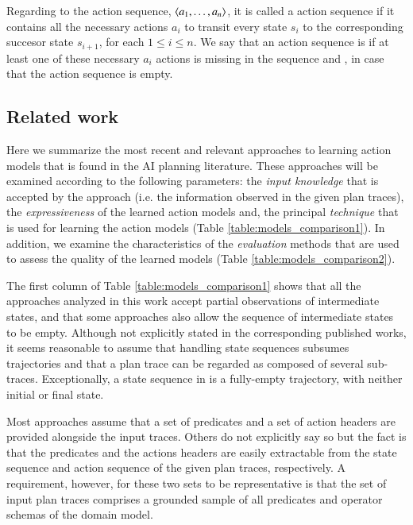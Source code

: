 Regarding to the action sequence, ${\langle a_1, \ldots, a_n \rangle}$, it is called a \FO action sequence if it contains all the necessary actions $a_i$ to transit every state $s_i$ to the corresponding succesor state $s_{i+1}$, for each {\small $1\leq i\leq n$}. We say that an action sequence is \PO if at least one of these necessary $a_i$ actions is missing in the sequence and \NO, in case that the action sequence is empty.


\subsection{Related work}
\label{related_work}

Here we summarize the most recent and relevant approaches to learning action models that is found in the AI planning literature. These approaches will be examined according to the following parameters: the {\em input knowledge} that is accepted by the approach (i.e. the information observed in the given plan traces), the {\em expressiveness} of the learned action models and, the principal {\em technique} that is used for learning the action models (Table \ref{table:models_comparison1}). In addition, we examine the characteristics of the {\em evaluation} methods that are used to assess the quality of the learned models (Table \ref{table:models_comparison2}).

The first column of Table \ref{table:models_comparison1} shows that all the approaches analyzed in this work accept partial observations of intermediate states, and that some approaches also allow the sequence of intermediate states to be empty. Although not explicitly stated in the corresponding published works, it seems reasonable to assume that handling \NO state sequences subsumes \POstar trajectories and that a \POstar plan trace can be regarded as composed of several \NO sub-traces. Exceptionally, a \NO state sequence in \LOCM is a fully-empty trajectory, with neither initial or final state.


Most approaches assume that a set of predicates and a set of action headers are provided alongside the input traces. Others do not explicitly say so but the fact is that the predicates and the actions headers are easily extractable from the state sequence and action sequence of the given plan traces, respectively. A requirement, however, for these two sets to be representative is that the set of input plan traces comprises a grounded sample of all predicates and operator schemas of the domain model.

